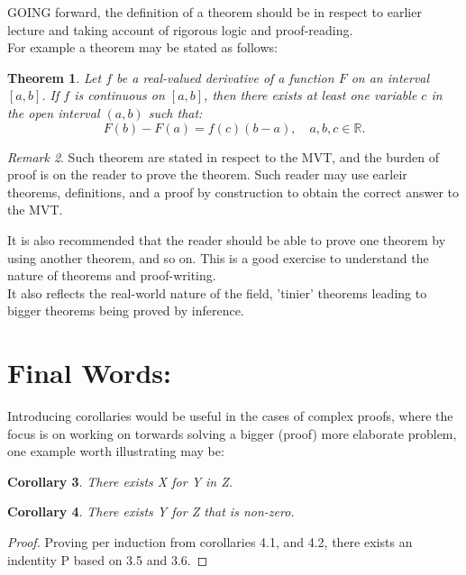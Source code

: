 \documentclass[10pt]{article}
\theoremstyle{plain}
\newtheorem{theorem}{Theorem}[section]
\newtheorem{corollary}[theorem]{Corollary}
\theoremstyle{definition}
\theoremstyle{remark}
\newtheorem{remark}[theorem]{Remark}
\begin{document}
\lettrine[lines=2, lhang=0.1, loversize=0.2]{G}OING forward, the definition of a theorem should be in respect to earlier lecture and taking account of rigorous logic and proof-reading.\\
For example a theorem may be stated as follows:

\begin{theorem}
	Let $f$ be a real-valued derivative of a function $F$ on an interval $[a, b]$. If $f$ is continuous on $[a, b]$, then there exists at least one variable $c$ in the open interval $(a, b)$ such that:
	\begin{equation}
		F(b) - F(a) = f(c)(b - a), \quad a, b, c \in \mathbb{R}.
	\end{equation}
\end{theorem}
\begin{remark}
	Such theorem are stated in respect to the MVT, and the burden of proof is on the reader to prove the theorem. Such reader may use earleir theorems, definitions, and a proof by construction to obtain the correct answer to the MVT.
\end{remark}
It is also recommended that the reader should be able to prove one theorem by using another theorem, and so on. This is a good exercise to understand the nature of theorems and proof-writing.\\
It also reflects the real-world nature of the field, 'tinier' theorems leading to bigger theorems being proved by inference. 

\section{Final Words:}

Introducing corollaries would be useful in the cases of complex proofs, where the focus is on working on torwards solving a bigger (proof) more elaborate problem, one example worth illustrating may be:

\begin{corollary}
	There exists X for Y in Z.
\end{corollary}

\begin{corollary}
	There exists Y for Z that is non-zero.
\end{corollary}

\begin{proof}
	Proving per induction from corollaries 4.1, and 4.2, there exists an indentity P based on 3.5 and 3.6.
\end{proof}
\end{document}
